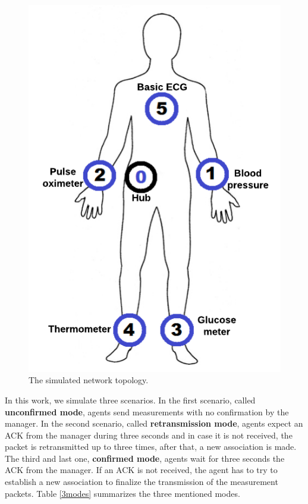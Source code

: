 \begin{figure}[htbp]
\centerline{\includegraphics[scale=0.29]{figures/corpoSensoresNomes.png}}
\caption{The simulated network topology.}
\label{fig:wbantopology}
\end{figure}

In this work, we simulate three scenarios. In the first scenario, called \textbf{unconfirmed mode}, agents send measurements with no confirmation by the manager. In the second scenario, called \textbf{retransmission mode}, agents expect an ACK from the manager during three seconds and in case it is not received, the packet is retransmitted up to three times, after that, a new association is made. The third and last one, \textbf{confirmed mode}, agents wait for three seconds the ACK from the manager. If an ACK is not received, the agent has to try to establish a new association to finalize the transmission of the measurement packets. Table \ref{3modes} summarizes the three mentioned modes. 

